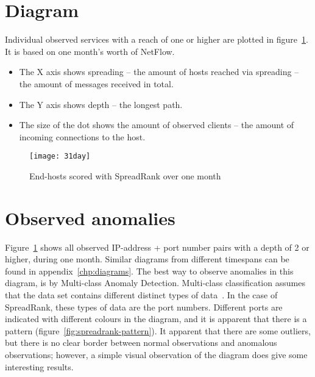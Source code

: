 \section{Diagram}
Individual observed services with a reach of one or higher are plotted in figure~\ref{fig:31day}.
It is based on one month's worth of NetFlow.

\begin{itemize}[label={$\bullet$}]
\item The X axis shows \gls{spreading} -- the amount of hosts reached via spreading -- the amount of messages received in total.
\item The Y axis shows \gls{depth} -- the longest path.
\item The size of the dot shows the amount of observed \gls{client}s -- the amount of incoming connections to the host.
\end{itemize}

\begin{figure}[h]
	\caption{End-hosts scored with SpreadRank over one month}
	\label{fig:31day}
	\centering
		\texttt{[image: 31day]}
\end{figure}


\section{Observed anomalies}
Figure~\ref{fig:31day} shows all observed IP-address + port number pairs with a \gls{depth} of 2 or higher, during one month.
Similar diagrams from different timespans can be found in appendix~\ref{chp:diagrams}.
The best way to observe anomalies in this diagram, is by Multi-class Anomaly Detection.
Multi-class classification assumes that the data set contains different distinct types of data~\cite{Chandola:2009:ADS:1541880.1541882}.
In the case of SpreadRank, these types of data are the port numbers.
Different ports are indicated with different colours in the diagram, and it is apparent that there is a pattern (figure~\ref{fig:spreadrank-pattern}).
It apparent that there are some outliers, but there is no clear border between normal observations and anomalous observations;
however, a simple visual observation of the diagram does give some interesting results.

